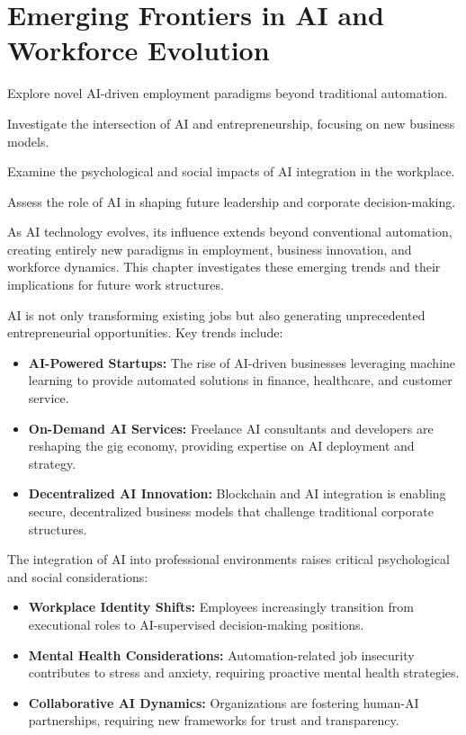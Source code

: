 \documentclass[a4paper,headinclude=on,footinclude=on,12pt,oneside]{scrbook}
\begin{document}
\chapter{Emerging Frontiers in AI and Workforce Evolution}

\begin{arrows}
	\item Explore novel AI-driven employment paradigms beyond traditional automation.
	\item Investigate the intersection of AI and entrepreneurship, focusing on new business models.
	\item Examine the psychological and social impacts of AI integration in the workplace.
	\item Assess the role of AI in shaping future leadership and corporate decision-making.
\end{arrows}


As AI technology evolves, its influence extends beyond conventional automation, creating entirely new paradigms in employment, business innovation, and workforce dynamics. This chapter investigates these emerging trends and their implications for future work structures.


AI is not only transforming existing jobs but also generating unprecedented entrepreneurial opportunities. Key trends include:
\begin{itemize}
	\item \textbf{AI-Powered Startups:} The rise of AI-driven businesses leveraging machine learning to provide automated solutions in finance, healthcare, and customer service.
	\item \textbf{On-Demand AI Services:} Freelance AI consultants and developers are reshaping the gig economy, providing expertise on AI deployment and strategy.
	\item \textbf{Decentralized AI Innovation:} Blockchain and AI integration is enabling secure, decentralized business models that challenge traditional corporate structures.
\end{itemize}


The integration of AI into professional environments raises critical psychological and social considerations:
\begin{itemize}
	\item \textbf{Workplace Identity Shifts:} Employees increasingly transition from executional roles to AI-supervised decision-making positions.
	\item \textbf{Mental Health Considerations:} Automation-related job insecurity contributes to stress and anxiety, requiring proactive mental health strategies.
	\item \textbf{Collaborative AI Dynamics:} Organizations are fostering human-AI partnerships, requiring new frameworks for trust and transparency.
\end{itemize}
\end{document}
